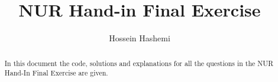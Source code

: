 \documentclass[a4paper,10pt]{article}
\title{NUR Hand-in Final Exercise}
\author{Hossein Hashemi}
\begin{document}
\maketitle

\begin{abstract}
In this document the code, solutions and explanations for all the questions in the NUR Hand-In Final Exercise are given.
\end{abstract}




\end{document}
